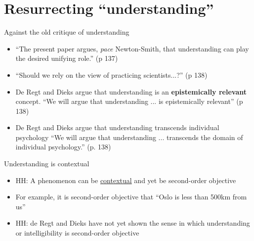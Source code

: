 \documentclass[fleqn]{beamer}
\begin{document}
\section{Resurrecting ``understanding''}

\begin{frame}{Against the old critique of understanding}

  \begin{itemize}
  \item ``The present paper argues, \emph{pace} Newton-Smith, that
    understanding can play the desired unifying role.'' (p 137)
  \item ``Should we rely on the view of practicing scientists...?'' (p
    138)
  \end{itemize}

\end{frame}
\begin{frame}

  \begin{itemize}    
  \item De Regt and Dieks argue that understanding is an
    \textbf{epistemically relevant} concept.  \newline ``We will argue
    that understanding ... is epistemically relevant'' (p 138)
  \item De Regt and Dieks argue that understanding transcends
    individual psychology \newline ``We will argue that understanding
    ...  transcends the domain of individual psychology.'' (p. 138)
  \end{itemize}

\end{frame}

\begin{frame}{Understanding is contextual}

  \begin{itemize}
  \item HH: A phenomenon can be \ul{contextual} and yet be
    second-order objective
  \item For example, it is second-order objective that ``Oslo is less
    than 500km from us''
  \item HH: de Regt and Dieks have not yet shown the sense in which
    understanding or intelligibility is second-order objective
  \end{itemize}

\end{frame}

\nocite{*}
\end{document}
